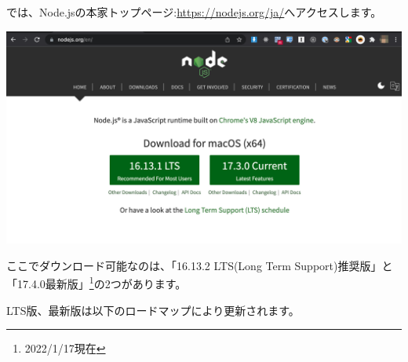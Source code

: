 では、Node.jsの本家トップページ:\url{https://nodejs.org/ja/}へアクセスします。

\begin{reviewimage}[H]%
\includegraphics[width=1.0\maxwidth]{./images/01-createDevEnv/01_01nodejsTop.png}%
\label{image:01-createDevEnv:01_01nodejsTop}
\end{reviewimage}

ここでダウンロード可能なのは、「16.13.2 LTS(Long Term Support)推奨版」と「17.4.0最新版」\footnote{2022/1/17現在}の2つがあります。

LTS版、最新版は以下のロードマップにより更新されます。

